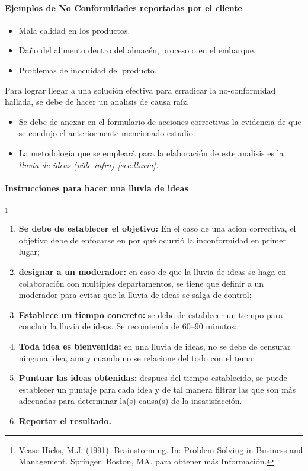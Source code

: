 \paragraph*{Ejemplos de No Conformidades reportadas por el cliente}
	\begin{itemize}
		\item Mala calidad en los productos.
		\item Daño del alimento dentro del almacén, proceso o en el embarque.
		\item Problemas de inocuidad del producto.
	\end{itemize}


\begin{note} \label{nota:RAC}
	Para lograr llegar a una solución efectiva para erradicar la no-conformidad hallada, se debe de hacer un analisis de causa raíz.
	\begin{itemize}
		\item Se debe de anexar en el formulario de acciones correctivas la evidencia de que se condujo el anteriormente mencionado estudio.
		\item La metodología que se empleará para la elaboración de este analisis es la \emph{lluvia de ideas} \textit{(vide infra) \cref{sec:lluvia}.}
	\end{itemize}
\end{note}

\paragraph{Instrucciones para hacer una lluvia de ideas}\footnote{Vease Hicks, M.J. (1991). Brainstorming. In: Problem Solving in Business and Management. Springer, Boston, MA. para obtener más Información.}\label{sec:lluvia}  
\begin{enumerate}
	\item \textbf{Se debe de establecer el objetivo:} En el caso de una acion correctiva, el objetivo debe de enfocarse en por qué ocurrió la inconformidad en primer lugar;
	\item \textbf{designar a un moderador:} en caso de que la lluvia de ideas se haga en colaboración con multiples departamentos, se tiene que definir a un moderador para evitar que la lluvia de ideas se salga de control;
	\item \textbf{Establece un tiempo concreto:} se debe de establecer un tiempo para concluir la lluvia de ideas. Se recomienda de 60--90 minutos;
	\item \textbf{Toda idea es bienvenida:} en una lluvia de ideas, no se debe de censurar ninguna idea, aun y cuando no se relacione del todo con el tema;
	\item \textbf{Puntuar las ideas obtenidas:} despues del tiempo establecido, se puede establecer un puntaje para cada idea y de tal manera filtrar las que son más adecuadas para determinar la(s) causa(s) de la insatisfacción.
	\item \textbf{Reportar el resultado.}
\end{enumerate}

